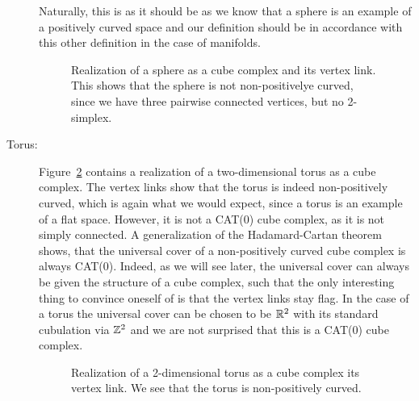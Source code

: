 \begin{bsp}
\begin{description}
    Naturally, this is as it should be as we know that a sphere is an example of a positively curved space and our definition should be in accordance with this other definition in the case of manifolds.
    \begin{figure}[htbp]
      \centering
      
      \caption{Realization of a sphere as a cube complex and its vertex link. This shows that the sphere is not non-positivelye curved, since we have three pairwise connected vertices, but no 2-simplex.}
      \label{fig:sphere}
    \end{figure}
  \item[Torus:] Figure~\ref{fig:torus} contains a realization of a two-dimensional torus as a cube complex. The vertex links show that the torus is indeed non-positively curved, which is again what we would expect, since a torus is an example of a flat space. However, it is not a CAT(0) cube complex, as it is not simply connected. A generalization of the Hadamard-Cartan theorem shows, that the universal cover of a non-positively curved cube complex is always CAT(0). Indeed, as we will see later, the universal cover can always be given the structure of a cube complex, such that the only interesting thing to convince oneself of is that the vertex links stay flag. In the case of a torus the universal cover can be chosen to be \(\mathbb{R}^2\) with its standard cubulation via \(\mathbb{Z}^2\) and we are not surprised that this is a CAT(0) cube complex.
    \begin{figure}[htbp]
      \centering
      
      \caption{Realization of a 2-dimensional torus as a cube complex its vertex link. We see that the torus is non-positively curved.}
      \label{fig:torus}
    \end{figure}


\end{description}
\end{bsp}

